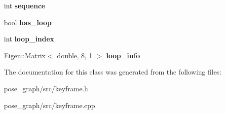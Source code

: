 \begin{DoxyCompactItemize}
int {\bfseries sequence}
\item 
\mbox{\label{classKeyFrame_ac79ed3195f749f9e7aef7af0be3cfcb3}} 
bool {\bfseries has\+\_\+loop}
\item 
\mbox{\label{classKeyFrame_ab2a6a3d21e8dfca017c3c88fdf4a0a35}} 
int {\bfseries loop\+\_\+index}
\item 
\mbox{\label{classKeyFrame_a771e35fa06a1cb90a7cc1c45ac2f0f5d}} 
Eigen\+::\+Matrix$<$ double, 8, 1 $>$ {\bfseries loop\+\_\+info}
\end{DoxyCompactItemize}


The documentation for this class was generated from the following files\+:\begin{DoxyCompactItemize}
\item 
pose\+\_\+graph/src/keyframe.\+h\item 
pose\+\_\+graph/src/keyframe.\+cpp\end{DoxyCompactItemize}
